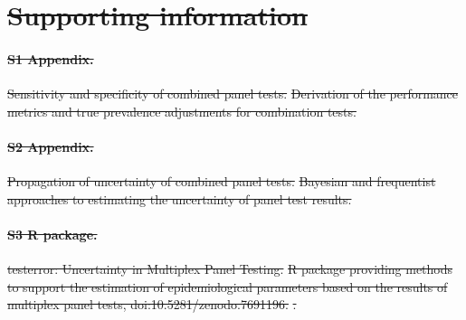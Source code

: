\documentclass[10pt,letterpaper]{article}
\providecommand{\DIFdeltex}[1]{{\protect\color{red}\sout{#1}}}                      %
\providecommand{\DIFdelbegin}{} %
\providecommand{\DIFdel}[1]{\texorpdfstring{\DIFdeltex{#1}}{}} %
\newcommand{\DIFscaledelfig}{0.5}
\newlength{\DIFdelgraphicswidth} %
\newlength{\DIFdelgraphicsheight} %
\newcommand{\DIFdelincludegraphics}[2][]{%
\sbox{\DIFdelgraphicsbox}{\DIFOincludegraphics[#1]{#2}}%
\settoboxwidth{\DIFdelgraphicswidth}{\DIFdelgraphicsbox} %
\settoboxtotalheight{\DIFdelgraphicsheight}{\DIFdelgraphicsbox} %
\scalebox{\DIFscaledelfig}{%
\parbox[b]{\DIFdelgraphicswidth}{\usebox{\DIFdelgraphicsbox}\\[-\baselineskip] \rule{\DIFdelgraphicswidth}{0em}}\llap{\resizebox{\DIFdelgraphicswidth}{\DIFdelgraphicsheight}{%
\setlength{\unitlength}{\DIFdelgraphicswidth}%
\begin{picture}(1,1)%
\thicklines\linethickness{2pt} %
{\color[rgb]{1,0,0}\put(0,0){\framebox(1,1){}}}%
{\color[rgb]{1,0,0}\put(0,0){\line( 1,1){1}}}%
{\color[rgb]{1,0,0}\put(0,1){\line(1,-1){1}}}%
\end{picture}%
}\hspace*{3pt}}} %
} %
\DeclareRobustCommand{\DIFdelbegin}{\DIFOdelbegin \let\includegraphics\DIFdelincludegraphics} %
\begin{document}
\DIFdelbegin \section*{\DIFdel{Supporting information}}


\paragraph*{\DIFdel{S1 Appendix.}}
\DIFdel{Sensitivity and specificity of combined panel tests.}%
\DIFdel{Derivation of the performance metrics and true prevalence adjustments for combination tests.
}%

\paragraph*{\DIFdel{S2 Appendix.}}
\DIFdel{Propagation of uncertainty of combined panel tests.}%
\DIFdel{Bayesian and frequentist approaches to estimating the uncertainty of panel test results.
}%

\paragraph*{\DIFdel{S3 R package.}}
\DIFdel{testerror: Uncertainty in Multiplex Panel Testing.}%
\DIFdel{R package providing methods to support the estimation of epidemiological parameters based on the results of multiplex panel tests, doi:10.5281/zenodo.7691196. }%
\DIFdel{.
}%
\end{document}
